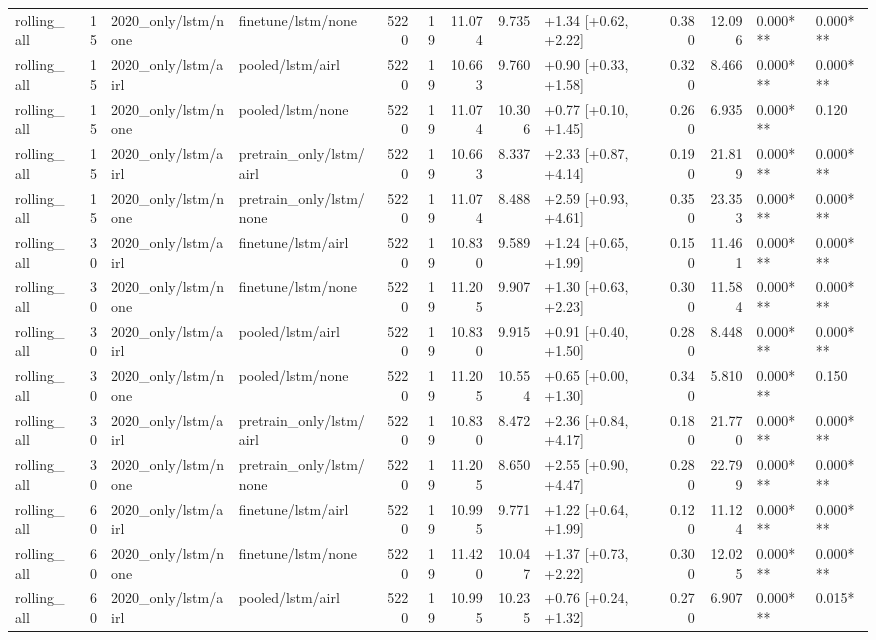 \begin{tabular}{lrllrrrrlrrll}
rolling_all & 15 & 2020_only/lstm/none & finetune/lstm/none & 5220 & 19 & 11.074 & 9.735 & +1.34 [+0.62, +2.22] & 0.380 & 12.096 & 0.000*** & 0.000*** \\
rolling_all & 15 & 2020_only/lstm/airl & pooled/lstm/airl & 5220 & 19 & 10.663 & 9.760 & +0.90 [+0.33, +1.58] & 0.320 & 8.466 & 0.000*** & 0.000*** \\
rolling_all & 15 & 2020_only/lstm/none & pooled/lstm/none & 5220 & 19 & 11.074 & 10.306 & +0.77 [+0.10, +1.45] & 0.260 & 6.935 & 0.000*** & 0.120 \\
rolling_all & 15 & 2020_only/lstm/airl & pretrain_only/lstm/airl & 5220 & 19 & 10.663 & 8.337 & +2.33 [+0.87, +4.14] & 0.190 & 21.819 & 0.000*** & 0.000*** \\
rolling_all & 15 & 2020_only/lstm/none & pretrain_only/lstm/none & 5220 & 19 & 11.074 & 8.488 & +2.59 [+0.93, +4.61] & 0.350 & 23.353 & 0.000*** & 0.000*** \\
rolling_all & 30 & 2020_only/lstm/airl & finetune/lstm/airl & 5220 & 19 & 10.830 & 9.589 & +1.24 [+0.65, +1.99] & 0.150 & 11.461 & 0.000*** & 0.000*** \\
rolling_all & 30 & 2020_only/lstm/none & finetune/lstm/none & 5220 & 19 & 11.205 & 9.907 & +1.30 [+0.63, +2.23] & 0.300 & 11.584 & 0.000*** & 0.000*** \\
rolling_all & 30 & 2020_only/lstm/airl & pooled/lstm/airl & 5220 & 19 & 10.830 & 9.915 & +0.91 [+0.40, +1.50] & 0.280 & 8.448 & 0.000*** & 0.000*** \\
rolling_all & 30 & 2020_only/lstm/none & pooled/lstm/none & 5220 & 19 & 11.205 & 10.554 & +0.65 [+0.00, +1.30] & 0.340 & 5.810 & 0.000*** & 0.150 \\
rolling_all & 30 & 2020_only/lstm/airl & pretrain_only/lstm/airl & 5220 & 19 & 10.830 & 8.472 & +2.36 [+0.84, +4.17] & 0.180 & 21.770 & 0.000*** & 0.000*** \\
rolling_all & 30 & 2020_only/lstm/none & pretrain_only/lstm/none & 5220 & 19 & 11.205 & 8.650 & +2.55 [+0.90, +4.47] & 0.280 & 22.799 & 0.000*** & 0.000*** \\
rolling_all & 60 & 2020_only/lstm/airl & finetune/lstm/airl & 5220 & 19 & 10.995 & 9.771 & +1.22 [+0.64, +1.99] & 0.120 & 11.124 & 0.000*** & 0.000*** \\
rolling_all & 60 & 2020_only/lstm/none & finetune/lstm/none & 5220 & 19 & 11.420 & 10.047 & +1.37 [+0.73, +2.22] & 0.300 & 12.025 & 0.000*** & 0.000*** \\
rolling_all & 60 & 2020_only/lstm/airl & pooled/lstm/airl & 5220 & 19 & 10.995 & 10.235 & +0.76 [+0.24, +1.32] & 0.270 & 6.907 & 0.000*** & 0.015* \\

\end{tabular}
